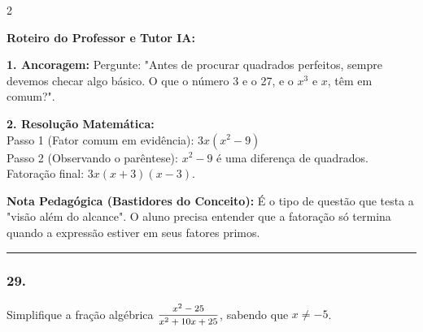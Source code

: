 \begin{multicols*}{2}
\ifgabarito
    \begin{tcolorbox}[colback=CorTitUm!5, colframe=CorTitUm, boxrule=1pt, arc=4pt, left=6pt, right=6pt, top=6pt, bottom=6pt]
    \small\textbf{\textcolor{CorTitUm}{Roteiro do Professor e Tutor IA:}}\par\vspace{0.1cm}
    \color{CinzaEscuro}
    \textbf{1. Ancoragem:} Pergunte: "Antes de procurar quadrados perfeitos, sempre devemos checar algo básico. O que o número 3 e o 27, e o $x^3$ e $x$, têm em comum?".\par\vspace{0.1cm}
    \textbf{2. Resolução Matemática:}\\
    Passo 1 (Fator comum em evidência): $3x(x^2 - 9)$\\
    Passo 2 (Observando o parêntese): $x^2 - 9$ é uma diferença de quadrados.\\
    Fatoração final: $3x(x + 3)(x - 3)$.
    \end{tcolorbox}
    \vspace{0.15cm}
    
    \begin{boxexplicacao}
    \textbf{Nota Pedagógica (Bastidores do Conceito):} É o tipo de questão que testa a "visão além do alcance". O aluno precisa entender que a fatoração só termina quando a expressão estiver em seus fatores primos.
    \end{boxexplicacao}
\fi

\par\vspace{\espacoQuestao}

\noindent\textcolor{CorLinha}{\rule{\linewidth}{0.5pt}} 
\par\vspace{\espacoPreQuestao}
\subsubsection*{29.} 
\begin{enunciadoLiteral}
Simplifique a fração algébrica $ \mfrac{x^2 - 25}{x^2 + 10x + 25} $, sabendo que $x \neq -5$.
\end{enunciadoLiteral}


\end{multicols*}
